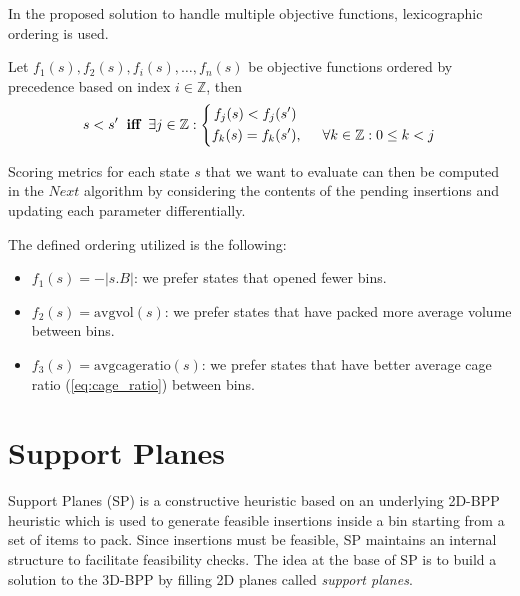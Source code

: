 In the proposed solution to handle multiple objective functions, lexicographic ordering is used.
\begin{definition}
    \label{def:lexicographic_ordering}
    Let $f_1(s), f_2(s), f_i(s), \dots, f_n(s)$ be objective functions ordered by precedence based on index $i \in \mathbb{Z}$, then 
    \begin{equation*}
        s < s^\prime \hspace{.2cm} \textbf{iff} \hspace{.2cm} \exists j \in \mathbb{Z} : \left\{
            \begin{aligned}
                f_j(s) < f_j(s^\prime) & \\
                f_k(s) = f_k(s^\prime) &,\hspace{.5cm} \forall k \in \mathbb{Z} : 0 \le k < j 
            \end{aligned}
        \right.
    \end{equation*}
\end{definition}

Scoring metrics for each state $s$ that we want to evaluate can then be computed in the $Next$ algorithm by considering the contents of the pending insertions and updating each parameter differentially.

The defined ordering utilized is the following:
\begin{itemize}
    \item $f_1(s) = -|s.B|$: we prefer states that opened fewer bins.
    \item $f_2(s) = \text{avgvol}(s)$: we prefer states that have packed more average volume between bins.
    \item $f_3(s) = \text{avgcageratio}(s)$: we prefer states that have better average cage ratio (\cref{eq:cage_ratio}) between bins.
\end{itemize}

\section{Support Planes}
\label{sec:support_planes}%
Support Planes (SP) is a constructive heuristic based on an underlying 2D-BPP heuristic which is used to generate feasible insertions inside a bin starting from a set of items to pack.
Since insertions must be feasible, SP maintains an internal structure to facilitate feasibility checks.
The idea at the base of SP is to build a solution to the 3D-BPP by filling 2D planes called \textit{support planes}.

